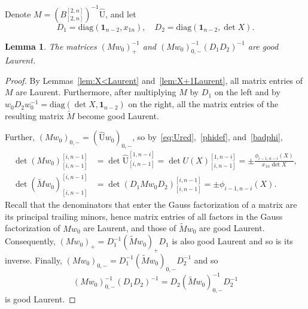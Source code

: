 \documentclass{amsart}
\newtheorem{lemma}[theorem]{Lemma}
\theoremstyle{definition}
\theoremstyle{remark}
\numberwithin{equation}{section}
\numberwithin{theorem}{section}
\def\UU{\mathrm U}
\def\one{\mathbf 1}
\begin{document}
Denote $M= \left (B_{[2,n]}^{[2,n]}\right )^{-1}\hat{\mathrm U}$, 
and let
\begin{equation}
\label{eq:D12}
D_1=\mbox{diag}(\one_{n-2}, x_{1n}),\quad  D_2=\mbox{diag}(\one_{n-2}, \det X).
\end{equation}
\begin{lemma}
\label{lem:MgoodLaurent}
The  matrices
$\left (M w_0\right )^{-1}_{+}$ and $\left (M w_0\right )^{-1}_{0,-} (D_1 D_2)^{-1}$
 are good Laurent.
\end{lemma}

\begin{proof}
By Lemmas~\ref{lem:X<Laurent} and~\ref{lem:X+1Laurent}, all matrix entries of $M$ are Laurent. Furthermore, after multiplying $M$ by $D_1$ on the left and by $w_0 D_2 w_0^{-1}=\mbox{diag}(\det X, \one_{n-2})$ on the right, all the matrix entries of the resulting matrix $\widetilde M$ become good Laurent.

Further, $\left (M w_0\right )_{0,-} = ( \widehat{\UU}w_0)_{0,-}$, so by~\eqref{eq:Ured},~\eqref{phidef}, 
and~\eqref{badphi},
\begin{align*}
\det(M w_0)_{[i,n-1]}^{[i,n-1]}&=\det\widehat{\UU}_{[i,n-1]}^{[1,n-i]}=\det U(X)_{[i,n-1]}^{[1,n-i]}
= \pm\frac{\phi_{i-1,n-i}(X)}{x_{1n}\det X},\\
\det(\widetilde M w_0)_{[i,n-1]}^{[i,n-1]}&= \det(D_1 M w_0 D_2)_{[i,n-1]}^{[i,n-1]}=\pm\phi_{i-1,n-i}(X).
\end{align*}
Recall that the denominators that enter the Gauss factorization of a matrix are its principal trailing minors, hence
matrix entries of all factors in the Gauss factorization of $M w_0$ are Laurent, and those of $\widetilde M w_0$ are good Laurent. Consequently, $\left (M w_0\right )_{+} =  D_1^{-1}   (\widetilde M w_0)_{+} D_1$ is also good Laurent and so is its inverse.  Finally, $\left (M w_0\right )_{0,-} =  D_1^{-1} (\widetilde M w_0 )_{0,-} D_2^{-1}$ and so
\[
\left (M w_0\right )^{-1}_{0,-} (D_1 D_2)^{-1} = D_2  (\widetilde M w_0)^{-1}_{0,-} D_2^{-1}
\]
is good Laurent.
\end{proof}
\end{document}
